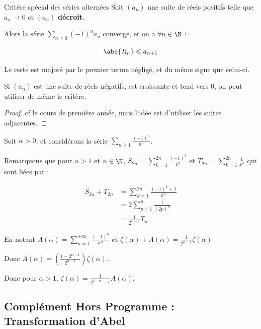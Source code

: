 \begin{theoreme}{Critère spécial des séries alternées}{}
    Soit $(a_n)$ une suite de réels positifs telle que $a_n \longrightarrow 0$ et $(a_n)$ \textbf{décroît}. 

    Alors la série $\sum_{n \geqslant 0} (-1)^n a_n$ converge, et on a $\forall n \in \N$ : 

    \[\abs{R_n} \leqslant a_{n + 1}\]

    Le reste est majoré par le premier terme négligé, et du même signe que celui-ci.
\end{theoreme}

\begin{remarque}
    Si $(a_n)$ est une suite de réels négatifs, est croissante et tend vers $0$, on peut utiliser de même le critère.
\end{remarque}

\begin{proof}
    cf le cours de première année, mais l'idée est d'utiliser les suites adjacentes. 
\end{proof}

\begin{exemple}
    Soit $\alpha > 0$, et considérons la série $\sum_{n \geqslant 1} \frac{(-1)^n }{n^\alpha}$.

    Remarquons que pour $\alpha > 1$ et $n \in \N$, $\displaystyle S_{2n} = \sum_{k = 1}^{2n} \frac{(-1)^k}{k^\alpha}$ et 
    $\displaystyle T_{2n} = \sum_{k = 1 }^{2n} \frac{1}{k^\alpha}$ qui sont liées par : 

    \begin{align*}
        S_{2n} + T_{2n} & = \sum_{k = 1}^{2n} \frac{(-1)^k + 1}{k^\alpha} \\
                        & = 2 \sum_{p = 1}^{n} \frac{1}{(2p)^\alpha} \\
                        & = \frac{1}{2^{\alpha - 1}} T_n 
    \end{align*}

    En notant $\displaystyle A(\alpha) = \sum_{n = 1}^{+\infty} \frac{(-1)^n}{n^\alpha}$ et $\displaystyle \zeta(\alpha) + A(\alpha) = \frac{1}{2^{\alpha - 1}} \zeta(\alpha)$

    Donc $A(\alpha) = \left( \frac{1 - 2^{\alpha - 1}}{2^{\alpha - 1}} \right) \zeta(\alpha)$.

    Donc pour $\alpha > 1$, $\displaystyle \zeta(\alpha) = \frac 1 {2^{1 - \alpha} - 1} A(\alpha)$.
\end{exemple}

\subsection{Complément Hors Programme : Transformation d'Abel}

